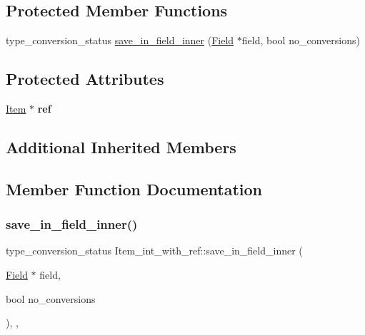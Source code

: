 \subsection*{Protected Member Functions}
\begin{DoxyCompactItemize}
\item 
type\+\_\+conversion\+\_\+status \mbox{\hyperlink{classItem__int__with__ref_a3b0eb8a477df3718cd623935eaaa73de}{save\+\_\+in\+\_\+field\+\_\+inner}} (\mbox{\hyperlink{classField}{Field}} $\ast$field, bool no\+\_\+conversions)
\end{DoxyCompactItemize}
\subsection*{Protected Attributes}
\begin{DoxyCompactItemize}
\item 
\mbox{\label{classItem__int__with__ref_acf3803ca61df664a11a4414a1d7f4673}} 
\mbox{\hyperlink{classItem}{Item}} $\ast$ {\bfseries ref}
\end{DoxyCompactItemize}
\subsection*{Additional Inherited Members}


\subsection{Member Function Documentation}
\mbox{\label{classItem__int__with__ref_a3b0eb8a477df3718cd623935eaaa73de}} 
\subsubsection{\texorpdfstring{save\+\_\+in\+\_\+field\+\_\+inner()}{save\_in\_field\_inner()}}
{\footnotesize\ttfamily type\+\_\+conversion\+\_\+status Item\+\_\+int\+\_\+with\+\_\+ref\+::save\+\_\+in\+\_\+field\+\_\+inner (\begin{DoxyParamCaption}\item[{\mbox{\hyperlink{classField}{Field}} $\ast$}]{field,  }\item[{bool}]{no\+\_\+conversions }\end{DoxyParamCaption})\hspace{0.3cm}{\ttfamily [inline]}, {\ttfamily [protected]}, {\ttfamily [virtual]}}

